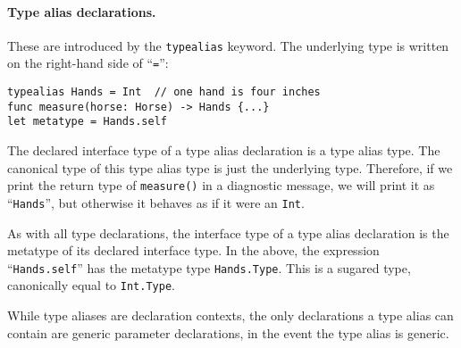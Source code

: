 \documentclass[../generics]{subfiles}
\begin{document}
\paragraph{Type alias declarations.} These are introduced by the \texttt{typealias} keyword. The underlying type is written on the right-hand side of ``\texttt{=}'':
\begin{Verbatim}
typealias Hands = Int  // one hand is four inches
func measure(horse: Horse) -> Hands {...}
let metatype = Hands.self
\end{Verbatim}
The declared interface type of a type alias declaration is a type alias type. The canonical type of this type alias type is just the underlying type. Therefore, if we print the return type of \texttt{measure()} in a diagnostic message, we will print it as ``\texttt{Hands}'', but otherwise it behaves as if it were an \texttt{Int}.

As with all type declarations, the interface type of a type alias declaration is the metatype of its declared interface type. In the above, the expression ``\texttt{Hands.self}'' has the metatype type \texttt{Hands.Type}. This is a sugared type, canonically equal to \texttt{Int.Type}.

While type aliases are declaration contexts, the only declarations a type alias can contain are generic parameter declarations, in the event the type alias is generic.
\end{document}
